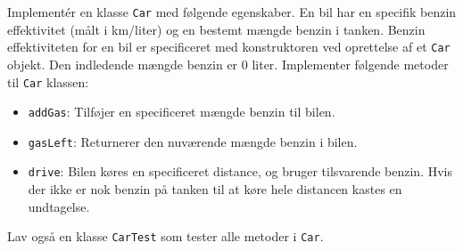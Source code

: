 \label{ex:car}
Implementér en klasse \texttt{Car} med følgende egenskaber. En bil har en specifik benzin effektivitet (målt i km/liter) og en bestemt mængde benzin i tanken. Benzin effektiviteten for en bil er specificeret med konstruktoren ved oprettelse af et \texttt{Car} objekt. Den indledende mængde benzin er 0 liter. Implementer følgende metoder til \texttt{Car} klassen:
  \begin{itemize}
  \item \texttt{addGas}: Tilføjer en specificeret mængde benzin til bilen.
  \item \texttt{gasLeft}: Returnerer den nuværende mængde benzin i bilen.
  \item \texttt{drive}: Bilen køres en specificeret distance, og bruger tilsvarende benzin. Hvis der ikke er nok benzin på tanken til at køre hele distancen kastes en undtagelse.
  \end{itemize}
  Lav også en klasse \texttt{CarTest} som tester alle metoder i \texttt{Car}.

